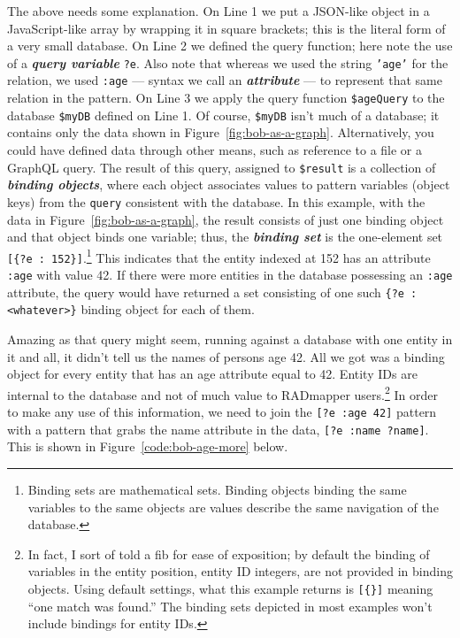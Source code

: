 \documentclass[10pt,letterpaper]{article} %
\newcommand{\stt}[1]{\texttt{#1}} %
\newcommand{\bdef}[1]{\textbf{\textit{#1}}}
\begin{document}
The above needs some explanation.
On Line 1 we put a JSON-like object in a JavaScript-like array by wrapping it in square brackets; this is the literal form of a very small database.
On Line 2 we defined the query function; here note the use of a \bdef{query variable} \stt{?e}.
Also note that whereas we used the string \stt{'age'} for the relation, we used \stt{:age} --- syntax we call an \bdef{attribute} --- to represent that same relation in the pattern.
On Line 3 we apply the query function \stt{\$ageQuery} to the database \stt{\$myDB} defined on Line 1.
Of course, \stt{\$myDB} isn't much of a database; it contains only the data shown in Figure~\ref{fig:bob-as-a-graph}.
Alternatively, you could have defined data through other means, such as reference to a file or a GraphQL query.
The result of this query, assigned to \stt{\$result} is a collection of \bdef{binding objects}, where each
object associates values to pattern variables (object keys) from the \stt{query} consistent with the database.
In this example, with the data in Figure~\ref{fig:bob-as-a-graph}, the result consists of just one binding object and that object binds one variable;
thus, the \bdef{binding  set} is the one-element set \stt{[\{?e : 152\}]}.\footnote{Binding sets are mathematical sets. Binding objects binding the same variables to the same objects are values describe the same navigation of the database.}
This indicates that the entity indexed at 152 has an attribute \stt{:age} with value 42.
If there were more entities in the database possessing an \stt{:age} attribute, the query would have returned a set consisting of one such \stt{\{?e : <whatever>\}} binding object for each of them.

Amazing as that query might seem, running against a database with one entity in it and all, it didn't tell us the names of persons age 42.
All we got was a binding object for every entity that has an age attribute equal to 42.
Entity IDs are internal to the database and not of much value to RADmapper users.\footnote{In fact, I sort of told a fib for ease of exposition; by default the binding of variables in the entity position, entity ID integers, are not provided in binding objects.
  Using default settings, what this example returns is \stt{[\{\}]} meaning ``one match was found.''
The binding sets depicted in most examples won't include bindings for entity IDs.}
In order to make any use of this information, we need to join the \stt{[?e :age 42]} pattern with a pattern that grabs the name attribute in the data, \stt{[?e :name ?name]}.
This is shown in Figure~\ref{code:bob-age-more} below.
\end{document}
